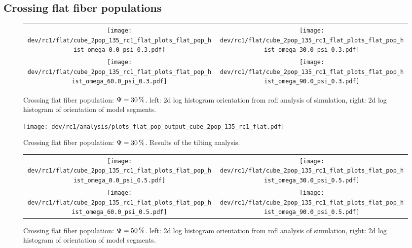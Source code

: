 \subsection{Crossing flat fiber populations}
\label{sec:resCrossFlat}
%
\begin{figure}[!t]
\centering
\setlength{\tikzwidth}{0.45\textwidth}
\begin{tabular}{c|c}
    \texttt{[image: dev/rc1/flat/cube\_2pop\_135\_rc1\_flat\_plots\_flat\_pop\_hist\_omega\_0.0\_psi\_0.3.pdf]} &
    \texttt{[image: dev/rc1/flat/cube\_2pop\_135\_rc1\_flat\_plots\_flat\_pop\_hist\_omega\_30.0\_psi\_0.3.pdf]} \\
    \texttt{[image: dev/rc1/flat/cube\_2pop\_135\_rc1\_flat\_plots\_flat\_pop\_hist\_omega\_60.0\_psi\_0.3.pdf]} &
    \texttt{[image: dev/rc1/flat/cube\_2pop\_135\_rc1\_flat\_plots\_flat\_pop\_hist\_omega\_90.0\_psi\_0.3.pdf]}
\end{tabular}
\caption[sim]{Crossing flat fiber population: $\textnormal{$\Psi$}=\SI{30}{\percent}$. left: 2d log histogram orientation from rofl analysis of simulation, right: 2d log histogram of orientation of model segments. }
\label{fig:flat_03_fiber_pop_hist}
\end{figure}
%
\begin{figure}[!p]
\centering
\texttt{[image: dev/rc1/analysis/plots\_flat\_pop\_output\_cube\_2pop\_135\_rc1\_flat.pdf]}
\caption[]{Crossing flat fiber population: $\textnormal{$\Psi$}=\SI{30}{\percent}$. Results of the tilting analysis.}
\label{fig:flat_03_fiber_pop_rofl}
\end{figure}
%
\begin{figure}[!t]
\centering
\setlength{\tikzwidth}{0.45\textwidth}
\begin{tabular}{c|c}
    \texttt{[image: dev/rc1/flat/cube\_2pop\_135\_rc1\_flat\_plots\_flat\_pop\_hist\_omega\_0.0\_psi\_0.5.pdf]} &
    \texttt{[image: dev/rc1/flat/cube\_2pop\_135\_rc1\_flat\_plots\_flat\_pop\_hist\_omega\_30.0\_psi\_0.5.pdf]} \\
    \texttt{[image: dev/rc1/flat/cube\_2pop\_135\_rc1\_flat\_plots\_flat\_pop\_hist\_omega\_60.0\_psi\_0.5.pdf]} &
    \texttt{[image: dev/rc1/flat/cube\_2pop\_135\_rc1\_flat\_plots\_flat\_pop\_hist\_omega\_90.0\_psi\_0.5.pdf]}
\end{tabular}
\caption[sim]{Crossing flat fiber population: $\textnormal{$\Psi$}=\SI{50}{\percent}$. left: 2d log histogram orientation from rofl analysis of simulation, right: 2d log histogram of orientation of model segments. }
\label{fig:flat_05_fiber_pop_hist}
\end{figure}
